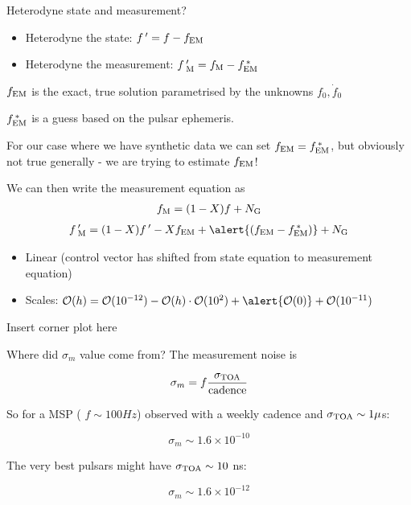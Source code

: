 \documentclass[10pt]{beamer}
\begin{document}
\begin{frame}{Heterodyne state and measurement?}
	
	\begin{itemize}
		\item Heterodyne the state: $f \, ' = f - f_{\rm EM}$ 
		\item Heterodyne the measurement: $f \, '_{\rm M}  = f_{\rm M} - f^{\, *}_{\rm EM}$ 
	\end{itemize}
	
	$f_{\rm EM}$ is the exact, true solution parametrised by the unknowns $f_0, \dot{f}_0$
	
	 $f^{\, *}_{\rm EM}$ is a guess based on the pulsar ephemeris. 
	 
	 For our case where we have synthetic data we can set $f_{\rm EM} = f^{\, *}_{\rm EM}$, but obviously not true generally - we are trying to estimate $f_{\rm EM}$!
	
	We can then write the measurement equation as
	\begin{eqnarray}
		f_{\rm M} = (1 - X)f + N_{\rm G} 
	\end{eqnarray}
\begin{eqnarray}
	f \, '_{\rm M} = (1 - X)f \, ' - X f_{\rm EM} + \alert{(f_{\rm EM} - f^{\, *}_{\rm EM})} +  N_{\rm G}
\end{eqnarray}
	
	\begin{itemize}
		\item Linear \checkmark (control vector has shifted from state equation to measurement equation)
		\item Scales: $\mathcal{O}(h) = \mathcal{O}(10^{-12}) - \mathcal{O}(h)\cdot\mathcal{O}(10^2) + \alert{\mathcal{O}(0)} + \mathcal{O}(10^{-11})$ \checkmark
	\end{itemize}
	
	
\end{frame}



\begin{frame}{}
	
Insert corner plot here
	
	
\end{frame}




\begin{frame}[fragile]{Where did $\sigma_m$ value come from?}
The measurement noise is

$$ \sigma_m = f \frac{\sigma_{\rm TOA}}{\rm cadence}$$

So for a MSP ( $f \sim 100 Hz$) observed with a weekly cadence and $\sigma_{\rm TOA} \sim 1 \mu$s:


$$\sigma_m \sim 1.6 \times 10^{-10}$$

The very best pulsars might have $\sigma_{\rm TOA} \sim 10$ ns:

$$\sigma_m \sim 1.6 \times 10^{-12}$$
\end{frame}
\end{document}
